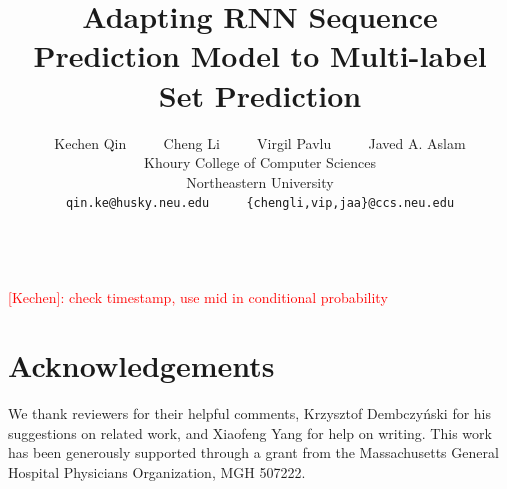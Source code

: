 \documentclass[11pt,a4paper]{article}
\title{Adapting RNN Sequence Prediction Model to Multi-label Set Prediction}
\author{Kechen Qin ~~~~ Cheng Li ~~~~ Virgil Pavlu ~~~~ Javed A. Aslam\\
  Khoury College of Computer Sciences \\
  Northeastern University\\
{\tt qin.ke@husky.neu.edu} ~~~~ {\tt \{chengli,vip,jaa\}@ccs.neu.edu}\\
   \\}
\date{}
\newcommand{\kechen}[1]{\textcolor{red}{[Kechen]: {#1}}}
\begin{document}
\maketitle
\begin{abstract}

\end{abstract}

\kechen{check timestamp, use mid in conditional probability}


% 







\section{Acknowledgements}
We thank reviewers for their helpful comments, 
Krzysztof Dembczyński for his suggestions on related work, and
Xiaofeng Yang for help on writing. This work
has been generously supported through a grant from the
Massachusetts General Hospital Physicians Organization,
MGH 507222.
% 
\clearpage
\newpage




\appendix
\end{document}
